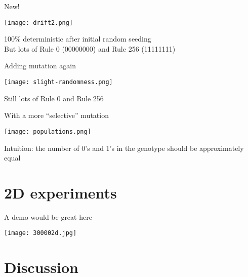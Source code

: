 \begin{frame}{New!}{}
\begin{center}
\texttt{[image: drift2.png]}
\pause

100\% deterministic after initial random seeding\\
\pause
But lots of Rule 0 (00000000) and Rule 256 (11111111)
\end{center}
\end{frame}

\begin{frame}{Adding mutation again}{}
\begin{center}
\texttt{[image: slight-randomness.png]}
\pause

Still lots of Rule 0 and Rule 256
\end{center}
\end{frame}

\begin{frame}{With a more ``selective'' mutation}{}
\begin{center}
\texttt{[image: populations.png]}
\pause

Intuition: the number of 0's and 1's in the genotype should be approximately equal
\end{center}
\end{frame}

\part{2D experiments}
\frame{\partpage}

\begin{frame}{A demo would be great here}{}
\begin{center}
\texttt{[image: 300002d.jpg]}
\end{center}
\end{frame}

\part{Discussion}
\frame{\partpage}

